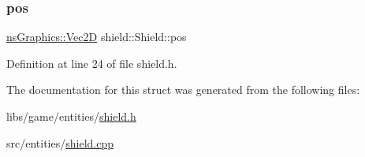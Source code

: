 \subsubsection{\texorpdfstring{pos}{pos}}
{\footnotesize\ttfamily \hyperlink{classns_graphics_1_1_vec2_d}{ns\+Graphics\+::\+Vec2D} shield\+::\+Shield\+::pos}



Definition at line 24 of file shield.\+h.



The documentation for this struct was generated from the following files\+:\begin{DoxyCompactItemize}
\item 
libs/game/entities/\hyperlink{shield_8h}{shield.\+h}\item 
src/entities/\hyperlink{shield_8cpp}{shield.\+cpp}\end{DoxyCompactItemize}
